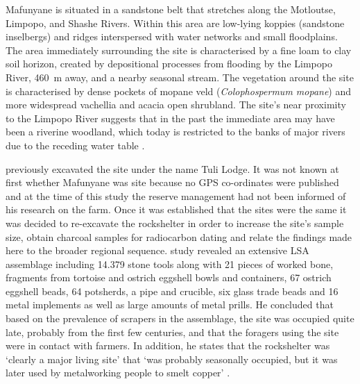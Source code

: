 	Mafunyane  is situated in a sandstone belt that stretches along the Motloutse, Limpopo, and Shashe Rivers. Within this area are low-lying koppies (sandstone inselbergs) and ridges interspersed with water networks and small floodplains. The area immediately surrounding the site is characterised by a fine loam to clay soil horizon, created by depositional processes from flooding by the Limpopo River, \SI{460}{\meter} away, and a nearby seasonal stream. The vegetation around the site is characterised by dense pockets of mopane veld (\emph{Colophospermum mopane}) and more widespread vachellia and acacia open shrubland. The site’s near proximity to the Limpopo River suggests that in the past the immediate area may have been a riverine woodland, which today is restricted to the banks of major rivers due to the receding water table \parencite{Alexander_1984}.
	
	\textcite{Walker_1994} previously excavated the site under the name Tuli Lodge. It was not known at first whether Mafunyane was \textcite['s]{Walker_1994} site because no GPS co-ordinates were published and at the time of this study the reserve management had not been informed of his research on the farm. Once it was established that the sites were the same it was decided to re-excavate the rockshelter in order to increase the site’s sample size, obtain charcoal samples for radiocarbon dating and relate the findings made here to the broader regional sequence. \textcite['s]{Walker_1994} study revealed an extensive LSA assemblage including \num{14,379} stone tools along with 21 pieces of worked bone, fragments from tortoise and ostrich eggshell bowls and containers, 67 ostrich eggshell beads, 64 potsherds, a pipe and crucible, six glass trade beads and 16 metal implements as well as large amounts of metal prills. He concluded that based on the prevalence of scrapers in the assemblage, the site was occupied quite late, probably from the first few centuries\AD, and that the foragers using the site were in contact with farmers. In addition, he states that the rockshelter was ‘clearly a major living site’ that ‘was probably seasonally occupied, but it was later used by metalworking people to smelt copper’ \textcite[10]{Walker_1994}. 
	

